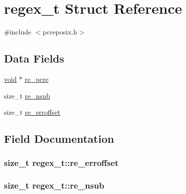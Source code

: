 \hypertarget{structregex__t}{}\section{regex\+\_\+t Struct Reference}
\label{structregex__t}


{\ttfamily \#include $<$pcreposix.\+h$>$}

\subsection*{Data Fields}
\begin{DoxyCompactItemize}
\item 
\hyperlink{group__MOD__ISAPI_gacd6cdbf73df3d9eed42fa493d9b621a6}{void} $\ast$ \hyperlink{structregex__t_ab3694f54105f125bc239be955f54143e}{re\+\_\+pcre}
\item 
size\+\_\+t \hyperlink{structregex__t_a4dfc1ce26c896695b77854da7d607ec8}{re\+\_\+nsub}
\item 
size\+\_\+t \hyperlink{structregex__t_a4ca064e058d5340df658822637ecba06}{re\+\_\+erroffset}
\end{DoxyCompactItemize}


\subsection{Field Documentation}
\subsubsection[{\texorpdfstring{re\+\_\+erroffset}{re_erroffset}}]{\setlength{\rightskip}{0pt plus 5cm}size\+\_\+t regex\+\_\+t\+::re\+\_\+erroffset}\hypertarget{structregex__t_a4ca064e058d5340df658822637ecba06}{}\label{structregex__t_a4ca064e058d5340df658822637ecba06}
\subsubsection[{\texorpdfstring{re\+\_\+nsub}{re_nsub}}]{\setlength{\rightskip}{0pt plus 5cm}size\+\_\+t regex\+\_\+t\+::re\+\_\+nsub}\hypertarget{structregex__t_a4dfc1ce26c896695b77854da7d607ec8}{}\label{structregex__t_a4dfc1ce26c896695b77854da7d607ec8}
